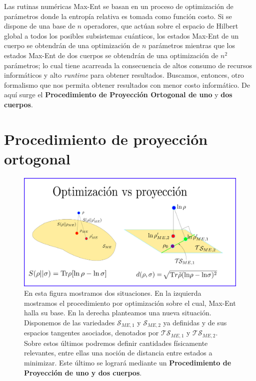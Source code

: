 \documentclass{report} %
\numberwithin{equation}{section}
\begin{document}
Las rutinas numéricas Max-Ent se basan en un proceso de optimización de parámetros donde la entropía relativa es tomada como función costo. Si se dispone de una base de $n$ operadores, que actúan sobre el espacio de Hilbert global a todos los posibles subsistemas cuánticos, los estados Max-Ent de un cuerpo se obtendrán de una optimización de $n$ parámetros mientras que los estados Max-Ent de dos cuerpos se obtendrán de una optimización de $n^2$ parámetros; lo cual tiene acarreada la consecuencia de altos consumo de recursos informáticos y alto \textit{runtime} para obtener resultados. Buscamos, entonces, otro formalismo que nos permita obtener resultados con menor costo informático. De aquí surge el \textbf{Procedimiento de Proyección Ortogonal de uno} y \textbf{dos cuerpos}. 

\section{Procedimiento de proyecci\'on ortogonal}
\label{ch_Max-Ent2}

\begin{figure}
    \centering
    \includegraphics[scale=0.35]{figs/aprox-ME3-last.png}
    \caption{En esta figura mostramos dos situaciones. En la izquierda mostramos el procedimiento por optimización sobre el cual, Max-Ent halla su base. En la derecha planteamos una nueva situación. Disponemos de las variedades $\mathcal{S}_{ME,1}$ y $\mathcal{S}_{ME,2}$ ya definidas y de sus espacios tangentes asociados, denotados por $\mathcal{TS}_{ME,1}$ y $\mathcal{TS}_{ME,2}$. Sobre estos últimos podremos definir cantidades físicamente relevantes, entre ellas una noción de distancia entre estados a minimizar. Este último se logrará mediante un \textbf{Procedimiento de Proyección de uno y dos cuerpos}. }
    \label{aprox-ME3_page-0001}
\end{figure}
\end{document}
